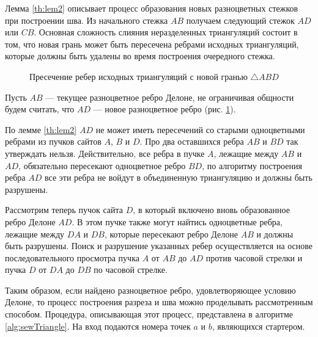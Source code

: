 \documentclass[12pt]{article}
\begin{document}
Лемма \ref{th:lem2} описывает процесс образования новых разноцветных стежков при построении шва.
Из начального стежка $AB$ получаем следующий стежок $AD$ или $CB$.
Основная сложность слияния неразделенных триангуляций состоит в том, что
новая грань может быть пересечена ребрами исходных триангуляций,
которые должны быть удалены во время построения очередного стежка.

\begin{figure}[htb!]
	\caption{Пресечение ребер исходных триангуляций с новой гранью $\triangle ABD$}
	\label{pic:triCorrection}
\end{figure}

Пусть $AB$ --- текущее разноцветное ребро Делоне, не ограничивая общности будем считать,
что $AD$ --- новое разноцветное ребро (рис. \ref{pic:triCorrection}).

По лемме \ref{th:lem2} $AD$ не может иметь пересечений со старыми одноцветными ребрами из пучков сайтов $A$, $B$ и $D$.
Про два оставшихся ребра $AB$ и $BD$ так утверждать нельзя.
Действительно, все ребра в пучке $A$, лежащие между $AB$ и $AD$, обязательно пересекают одноцветное ребро $BD$,
по алгоритму построения ребра $AD$ все эти ребра не войдут в объединенную триангуляцию и должны быть разрушены.

Рассмотрим теперь пучок сайта $D$, в который включено вновь образованное ребро Делоне $AD$.
В этом пучке также могут найтись одноцветные ребра, лежащие между $DA$ и $DB$, которые пересекают ребро Делоне $AB$ и должны быть разрушены.
Поиск и разрушение указанных ребер осуществляется на основе последовательного просмотра пучка $A$ от $AB$ до $AD$ против часовой стрелки и пучка $D$ от $DA$ до $DB$ по часовой стрелке.

Таким образом, если найдено разноцветное ребро, удовлетворяющее условию Делоне,
то процесс построения разреза и шва можно проделывать рассмотренным способом.
Процедура, описывающая этот процесс, представлена в алгоритме \ref{alg:sewTriangle}.
На вход подаются номера точек $a$ и $b$, являющихся стартером.
\end{document}
